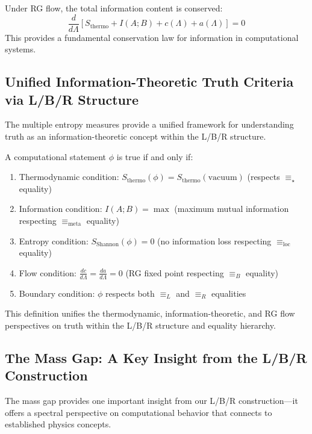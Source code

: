 \begin{theorem}
\begin{theorem}
\label{thm:info-flow-conservation}
Under RG flow, the total information content is conserved:
\[
\frac{d}{d\Lambda} \left[ S_{\text{thermo}} + I(A;B) + c(\Lambda) + a(\Lambda) \right] = 0
\]
This provides a fundamental conservation law for information in computational systems.
\end{theorem}

\subsection{Unified Information-Theoretic Truth Criteria via L/B/R Structure}

The multiple entropy measures provide a unified framework for understanding truth as an information-theoretic concept within the L/B/R structure.

\begin{definition}
\label{def:info-truth-lbr}
A computational statement $\phi$ is true if and only if:
\begin{enumerate}
\item Thermodynamic condition: $S_{\text{thermo}}(\phi) = S_{\text{thermo}}(\text{vacuum})$ (respects $\equiv_\star$ equality)
\item Information condition: $I(A;B) = \max$ (maximum mutual information respecting $\equiv_{\text{meta}}$ equality)
\item Entropy condition: $S_{\text{Shannon}}(\phi) = 0$ (no information loss respecting $\equiv_{\text{loc}}$ equality)
\item Flow condition: $\frac{dc}{d\Lambda} = \frac{da}{d\Lambda} = 0$ (RG fixed point respecting $\equiv_B$ equality)
\item Boundary condition: $\phi$ respects both $\equiv_L$ and $\equiv_R$ equalities
\end{enumerate}
\end{definition}

This definition unifies the thermodynamic, information-theoretic, and RG flow perspectives on truth within the L/B/R structure and equality hierarchy.

\subsection{The Mass Gap: A Key Insight from the L/B/R Construction}

The mass gap provides one important insight from our L/B/R construction—it offers a spectral perspective on computational behavior that connects to established physics concepts.


\end{theorem}
